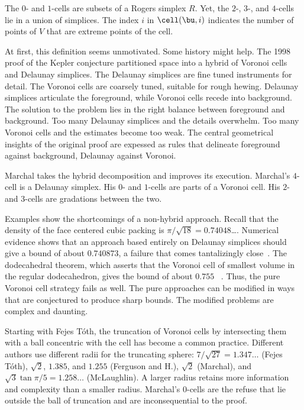 The $0$- and $1$-cells are  subsets of a Rogers  simplex
$R$.  Yet, the $2$-, $3$-, and $4$-cells lie in a union of
simplices.  The index $i$ in  $\cell(\bu,i)$ indicates the number
of points of $V$ that are extreme points of the cell. 

At first, this definition seems unmotivated.  Some history might help.
The 1998 proof of the Kepler conjecture partitioned space into a
hybrid of Voronoi cells and Delaunay simplices.  The Delaunay
simplices are fine tuned instruments for detail.  The Voronoi cells
are coarsely tuned, suitable for rough hewing.  Delaunay simplices
articulate the foreground, while Voronoi cells recede into background.  The
solution to the problem lies in the right balance between foreground
and background.  Too many Delaunay simplices and the details
overwhelm.  Too many Voronoi cells and the estimates become too weak.
The central geometrical insights of the original proof are expessed as
rules that delineate foreground against background, Delaunay against
Voronoi.

Marchal takes the  hybrid decomposition and improves its
execution.  Marchal's $4$-cell is a Delaunay simplex.  His $0$- and
$1$-cells are parts of a Voronoi cell.  His $2$- and $3$-cells are
gradations between the two.

Examples show the shortcomings of a non-hybrid approach.
Recall that the density of the face centered cubic packing is
$\pi/\sqrt{18}=0.74048$\ldots.  Numerical evidence shows that an
approach based entirely on Delaunay simplices should give a bound of
about $0.740873$, a failure that comes tantalizingly
close~\cite{Hales:1992:JCAM}.  The dodecahedral theorem, which asserts that the
Voronoi cell of smallest volume in the regular dodecahedron, gives the
bound of about $0.755$ ~\cite{Hales:2010:Dodec}.  Thus, the pure Voronoi cell
strategy fails as well.  The pure approaches can be modified in ways
that are conjectured to produce sharp bounds. The modified problems
are complex and daunting.

Starting with Fejes T\'oth,  the truncation of Voronoi cells by intersecting them with a ball concentric
with the cell  has become a common practice.  Different authors use different radii for the
truncating sphere: $7/\sqrt{27}=1.347\ldots$ (Fejes T\'oth), $\sqrt2$,
$1.385$, and $1.255$ (Ferguson and H.), $\sqrt2$ (Marchal), and
$\sqrt{3}\tan{\pi/5}=1.258\ldots$ (McLaughlin).  A larger radius
retains more information and complexity than a smaller radius.
Marchal's $0$-cells are the refuse that lie outside the ball of truncation and
are inconsequential to the proof.


